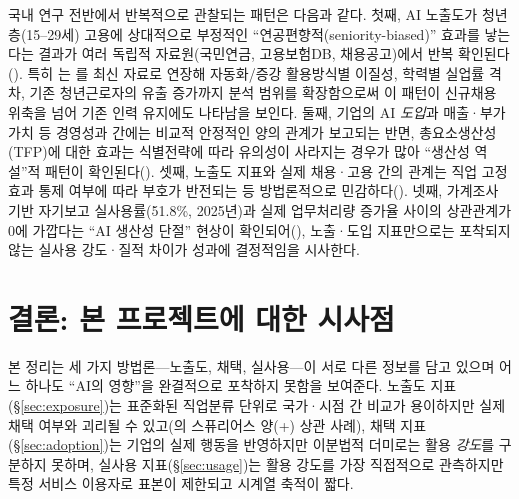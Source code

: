 \documentclass[11pt]{article}
\begin{document}
국내 연구 전반에서 반복적으로 관찰되는 패턴은 다음과 같다. 첫째, AI 노출도가 청년층(15--29세) 고용에 상대적으로 부정적인 ``연공편향적(seniority-biased)'' 효과를 낳는다는 결과가 여러 독립적 자료원(국민연금, 고용보험DB, 채용공고)에서 반복 확인된다(\citealp{han-2025-ai-diffusion-youth-employment-decline, bok-2026-youth-employment-decline-ai-career-ladder, chang-2026-ai-technology-diffusion-employment, keis-2025-ai-job-exposure-labor-demand, noh-2025-ai-based-manufacturing-innovation-employment}). 특히 \citet{bok-2026-youth-employment-decline-ai-career-ladder}는 \citet{han-2025-ai-diffusion-youth-employment-decline}를 최신 자료로 연장해 자동화/증강 활용방식별 이질성, 학력별 실업률 격차, 기존 청년근로자의 유출 증가까지 분석 범위를 확장함으로써 이 패턴이 신규채용 위축을 넘어 기존 인력 유지에도 나타남을 보인다. 둘째, 기업의 AI \emph{도입}과 매출·부가가치 등 경영성과 간에는 비교적 안정적인 양의 관계가 보고되는 반면, 총요소생산성(TFP)에 대한 효과는 식별전략에 따라 유의성이 사라지는 경우가 많아 ``생산성 역설''적 패턴이 확인된다(\citealp{kiet-2021-ai-adoption-productivity, kiet-2024-ai-adoption-firms-policy, kim-2025-ai-adoption-firm-performance}). 셋째, 노출도 지표와 실제 채용·고용 간의 관계는 직업 고정효과 통제 여부에 따라 부호가 반전되는 등 방법론적으로 민감하다(\citealp{keis-2025-ai-job-exposure-labor-demand, kiet-2025-ai-occupational-employment-effect}). 넷째, 가계조사 기반 자기보고 실사용률(51.8\%, 2025년)과 실제 업무처리량 증가율 사이의 상관관계가 0에 가깝다는 ``AI 생산성 단절'' 현상이 확인되어(\citealp{bok-2026-ai-adoption-productivity-effects}), 노출·도입 지표만으로는 포착되지 않는 실사용 강도·질적 차이가 성과에 결정적임을 시사한다.

\section{결론: 본 프로젝트에 대한 시사점}

본 정리는 세 가지 방법론—노출도, 채택, 실사용—이 서로 다른 정보를 담고 있으며 어느 하나도 ``AI의 영향''을 완결적으로 포착하지 못함을 보여준다. 노출도 지표(\S\ref{sec:exposure})는 표준화된 직업분류 단위로 국가·시점 간 비교가 용이하지만 실제 채택 여부와 괴리될 수 있고(\citealp{keis-2025-ai-job-exposure-labor-demand}의 스퓨리어스 양(+) 상관 사례), 채택 지표(\S\ref{sec:adoption})는 기업의 실제 행동을 반영하지만 이분법적 더미로는 활용 \emph{강도}를 구분하지 못하며, 실사용 지표(\S\ref{sec:usage})는 활용 강도를 가장 직접적으로 관측하지만 특정 서비스 이용자로 표본이 제한되고 시계열 축적이 짧다.
\end{document}

